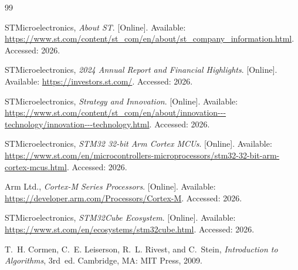 \documentclass[12pt,a4paper,oneside]{book}
\begin{document}













\appendix








\begin{thebibliography}{99}


STMicroelectronics, \emph{About ST}. [Online]. Available: \url{https://www.st.com/content/st_com/en/about/st_company_information.html}. Accessed: 2026.

STMicroelectronics, \emph{2024 Annual Report and Financial Highlights}. [Online]. Available: \url{https://investors.st.com/}. Accessed: 2026.

STMicroelectronics, \emph{Strategy and Innovation}. [Online]. Available: \url{https://www.st.com/content/st_com/en/about/innovation---technology/innovation---technology.html}. Accessed: 2026.

STMicroelectronics, \emph{STM32 32-bit Arm Cortex MCUs}. [Online]. Available: \url{https://www.st.com/en/microcontrollers-microprocessors/stm32-32-bit-arm-cortex-mcus.html}. Accessed: 2026.

Arm Ltd., \emph{Cortex-M Series Processors}. [Online]. Available: \url{https://developer.arm.com/Processors/Cortex-M}. Accessed: 2026.

STMicroelectronics, \emph{STM32Cube Ecosystem}. [Online]. Available: \url{https://www.st.com/en/ecosystems/stm32cube.html}. Accessed: 2026.

T.~H. Cormen, C.~E. Leiserson, R.~L. Rivest, and C.~Stein, \emph{Introduction to Algorithms}, 3rd~ed. Cambridge, MA: MIT Press, 2009.



\end{thebibliography}
\end{document}
